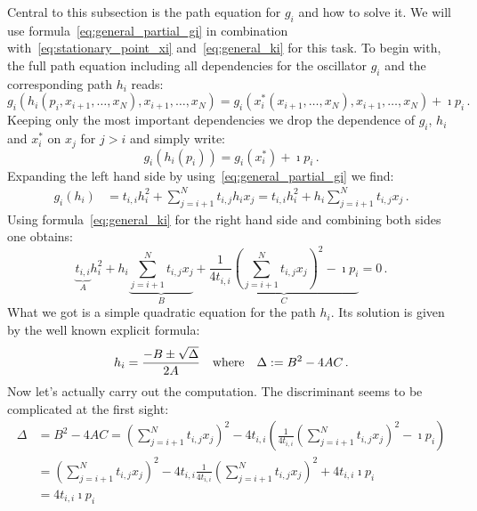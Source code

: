 \documentclass[a4paper,10pt]{article}
\begin{document}
Central to this subsection is the path equation for $g_i$ and how to
solve it. We will use formula~\eqref{eq:general_partial_gi} in combination
with~\eqref{eq:stationary_point_xi} and~\eqref{eq:general_ki} for this task.
To begin with, the full path equation including all dependencies for the
oscillator $g_i$ and the corresponding path $h_i$ reads:
\begin{equation*}
  g_i\left(h_i\left(p_i, x_{i+1}, \ldots, x_N\right), x_{i+1}, \ldots, x_N\right)
  = g_i\left(x_i^{*}\left(x_{i+1}, \ldots, x_N\right), x_{i+1}, \ldots, x_N\right) + \imath p_i \,.
\end{equation*}
Keeping only the most important dependencies we drop the dependence
of $g_i$, $h_i$ and $x_i^{*}$ on $x_j$ for $j>i$ and simply write:
\begin{equation}\label{eq:general_path_eqn}
  g_i\left(h_i\left(p_i\right)\right) = g_i\left(x_i^*\right) + \imath p_i \,.
\end{equation}
Expanding the left hand side by using~\eqref{eq:general_partial_gi} we find:
\begin{equation}
\begin{split}
  g_i\left(h_i\right)
  & = t_{i,i} h_i^2 + \sum_{j=i+1}^{N} t_{i,j} h_i x_j
    = t_{i,i} h_i^2 +  h_i \sum_{j=i+1}^{N} t_{i,j} x_j \,.
\end{split}
\end{equation}
Using formula~\eqref{eq:general_ki} for the right hand side and
combining both sides one obtains:
\begin{equation}
  \underbrace{t_{i,i}}_{A} h_i^2
  +
  h_i \underbrace{\sum_{j=i+1}^{N} t_{i,j} x_j}_{B}
  +
  \underbrace{\frac{1}{4 t_{i,i}} {\left( \sum_{j=i+1}^{N} t_{i,j} x_j \right)}^2 - \imath p_i}_{C}
  = 0 \,.
\end{equation}
What we got is a simple quadratic equation for the path $h_i$.
Its solution is given by the well known explicit formula:
\begin{equation}
  h_i = \frac{-B \pm \sqrt{\Delta}}{2 A}
  \quad \text{where} \quad
  \Delta := B^2 - 4 A C \,.
\end{equation}
Now let's actually carry out the computation.
The discriminant seems to be complicated at the first sight:
\begin{equation}
\begin{split}
  \Delta & = B^2 - 4 A C
  = {\left(\sum_{j=i+1}^{N} t_{i,j} x_j\right)}^2
    - 4 t_{i,i} \left(\frac{1}{4 t_{i,i}} {\left( \sum_{j=i+1}^{N} t_{i,j} x_j \right)}^2 - \imath p_i\right) \\
  & = {\left(\sum_{j=i+1}^{N} t_{i,j} x_j\right)}^2
      - 4 t_{i,i} \frac{1}{4 t_{i,i}} {\left( \sum_{j=i+1}^{N} t_{i,j} x_j \right)}^2
      + 4 t_{i,i} \imath p_i \\
  & = 4 t_{i,i} \imath p_i
\end{split}
\end{equation}
\end{document}
